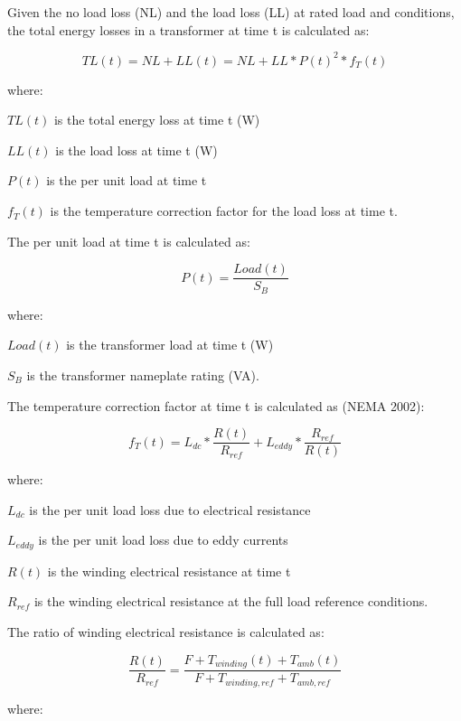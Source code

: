 Given the no load loss (NL) and the load loss (LL) at rated load and conditions, the total energy losses in a transformer at time t is calculated as:

\begin{equation}
TL(t) = NL + LL(t) = NL + LL*P{(t)^2}*{f_T}(t)
\label{eq:TotalEnergyLossesInTransformers}
\end{equation}

where:

\(TL(t)\) is the total energy loss at time t (W)

\(LL(t)\) is the load loss at time t (W)

\(P(t)\) is the per unit load at time t

\({f_T}(t)\) is the temperature correction factor for the load loss at time t.

The per unit load at time t is calculated as:

\begin{equation}
P(t) = \frac{{Load(t)}}{{{S_B}}}
\end{equation}

where:

\(Load(t)\) is the transformer load at time t (W)

\({S_B}\) is the transformer nameplate rating (VA).

The temperature correction factor at time t is calculated as (NEMA 2002):

\begin{equation}
{f_T}(t) = {L_{dc}}*\frac{{R(t)}}{{{R_{ref}}}} + {L_{eddy}}*\frac{{{R_{ref}}}}{{R(t)}}
\end{equation}

where:

\({L_{dc}}\) is the per unit load loss due to electrical resistance

\({L_{eddy}}\) is the per unit load loss due to eddy currents

\(R(t)\) is the winding electrical resistance at time t

\({R_{ref}}\) is the winding electrical resistance at the full load reference conditions.

The ratio of winding electrical resistance is calculated as:

\begin{equation}
\frac{{R(t)}}{{{R_{ref}}}} = \frac{{F + {T_{winding}}(t) + {T_{amb}}(t)}}{{F + {T_{winding,ref}} + {T_{amb,ref}}}}
\end{equation}

where:

